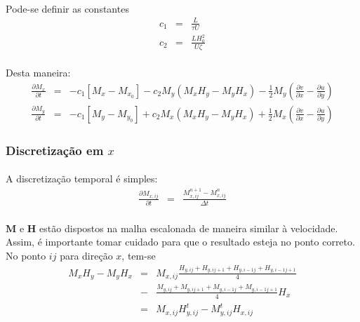 \documentclass[eletromagnetismo.tex]{subfiles}
\begin{document}
\paragraph{} Pode-se definir as constantes \begin{eqnarray}
c_1 & = & \frac{L}{\tau U}\\
c_2 & = & \frac{LH_0^2}{U\zeta}
\end{eqnarray}

\paragraph{} Desta maneira:
\begin{eqnarray}
\frac{\partial M_x}{\partial t} & = & -c_1[M_x - M_{x_0}]-c_2 M_y(M_x H_y - M_y H_x)-\frac{1}{2}M_y\left(\frac{\partial v}{\partial x} - \frac{\partial u}{\partial y}\right)\\
\frac{\partial M_y}{\partial t} & = & -c_1[M_y - M_{y_0}]+c_2 M_x(M_x H_y - M_y H_x)+\frac{1}{2}M_x\left(\frac{\partial v}{\partial x} - \frac{\partial u}{\partial y}\right)
\end{eqnarray}

\subsubsection{Discretização em $x$}

\paragraph{} A discretização temporal é simples:
\begin{eqnarray}
	\frac{\partial M_{x,ij}}{\partial t} & = & \frac{M_{x,ij}^{n+1} - M_{x,ij}^n}{\Delta t}
\end{eqnarray}

\paragraph{} $\mathbf{M}$ e $\mathbf{H}$ estão dispostos na malha escalonada de maneira similar à velocidade. Assim, é importante tomar cuidado para que o resultado esteja no ponto correto. No ponto $ij$ para direção $x$, tem-se \begin{eqnarray}
M_x H_y - M_y H_x & = & M_{x,ij} \frac{H_{y,ij}+H_{y,ij+1}+H_{y,i-1j}+H_{y,i-1j+1}}{4}\\ &-& \frac{M_{y,ij}+M_{y,ij+1}+M_{y,i-1j}+M_{y,i-1j+1}}{4} H_x\\
&=& M_{x,ij} H_{y,ij}^t - M_{y,ij}^t H_{x,ij}
\end{eqnarray}
\end{document}
